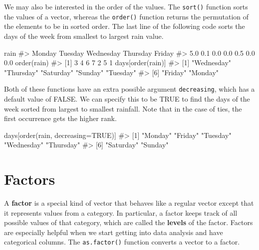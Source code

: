 \documentclass[
  letterpaper,
]{latex/krantz}
\makeatletter
\newenvironment{Shaded}{\begin{snugshade}}{\end{snugshade}}
\newcommand{\AttributeTok}[1]{\textcolor[rgb]{0.40,0.45,0.13}{#1}}
\newcommand{\CommentTok}[1]{\textcolor[rgb]{0.37,0.37,0.37}{#1}}
\newcommand{\ConstantTok}[1]{\textcolor[rgb]{0.56,0.35,0.01}{#1}}
\newcommand{\FunctionTok}[1]{\textcolor[rgb]{0.28,0.35,0.67}{#1}}
\newcommand{\NormalTok}[1]{\textcolor[rgb]{0.00,0.23,0.31}{#1}}
\newenvironment{kframe}{%
\medskip{}
\setlength{\fboxsep}{.8em}
 \def\at@end@of@kframe{}%
 \ifinner\ifhmode%
  \def\at@end@of@kframe{\end{minipage}}%
  \begin{minipage}{\columnwidth}%
 \fi\fi%
 \def\FrameCommand##1{\hskip\@totalleftmargin \hskip-\fboxsep
 \colorbox{shadecolor}{##1}\hskip-\fboxsep
     \hskip-\linewidth \hskip-\@totalleftmargin \hskip\columnwidth}%
 \MakeFramed {\advance\hsize-\width
   \@totalleftmargin\z@ \linewidth\hsize
   \@setminipage}}%
 {\par\unskip\endMakeFramed%
 \at@end@of@kframe}
\renewenvironment{Shaded}{\begin{kframe}}{\end{kframe}}
\makeatother
\begin{document}
We may also be interested in the order of the values. The
\texttt{sort()} function sorts
the values of a vector, whereas the
\texttt{order()} function
returns the permutation of the elements to be in sorted order. The last
line of the following code sorts the days of the week from smallest to
largest rain value.

\begin{Shaded}
\begin{Highlighting}[]
\NormalTok{rain}
\CommentTok{\#\textgreater{}    Monday   Tuesday Wednesday  Thursday    Friday                     }
\CommentTok{\#\textgreater{}       5.0       0.1       0.0       0.0       0.5       0.0       0.0}
\FunctionTok{order}\NormalTok{(rain)}
\CommentTok{\#\textgreater{} [1] 3 4 6 7 2 5 1}
\NormalTok{days[}\FunctionTok{order}\NormalTok{(rain)]}
\CommentTok{\#\textgreater{} [1] "Wednesday" "Thursday"  "Saturday"  "Sunday"    "Tuesday"  }
\CommentTok{\#\textgreater{} [6] "Friday"    "Monday"}
\end{Highlighting}
\end{Shaded}

Both of these functions have an extra possible argument
\texttt{decreasing}, which has a default value of FALSE. We can specify
this to be TRUE to find the days of the week sorted from largest to
smallest rainfall. Note that in the case of ties, the first occurrence
gets the higher rank.

\begin{Shaded}
\begin{Highlighting}[]
\NormalTok{days[}\FunctionTok{order}\NormalTok{(rain, }\AttributeTok{decreasing=}\ConstantTok{TRUE}\NormalTok{)]}
\CommentTok{\#\textgreater{} [1] "Monday"    "Friday"    "Tuesday"   "Wednesday" "Thursday" }
\CommentTok{\#\textgreater{} [6] "Saturday"  "Sunday"}
\end{Highlighting}
\end{Shaded}

\section{\texorpdfstring{Factors
}{Factors }}\label{factors}

A \textbf{factor} is a special kind of vector that behaves like a
regular vector except that it represents values from a category. In
particular, a factor keeps track of all possible values of that
category, which are called the \textbf{levels} of
the factor. Factors are especially helpful when we start getting into
data analysis and have categorical columns. The
\texttt{as.factor()}
function converts a vector to a factor.
\end{document}
